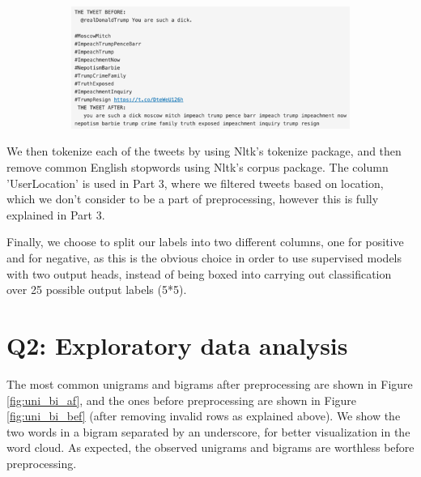 \begin{figure}
    \centering
    \begin{subfigure}{0.5\columnwidth}
        \includegraphics[width=1\textwidth]{images/prepr1.png}
    \end{subfigure}
    \caption{}
    \label{fig:prepr}
\end{figure}


We then tokenize each of the tweets by using Nltk's tokenize package, and then remove common English stopwords using Nltk's corpus package.
The column 'UserLocation' is used in Part 3, where we filtered tweets based on location, which we don't consider to be a part of preprocessing, however this is fully explained in Part 3. 

Finally, we choose to split our labels into two different columns, one for positive and for negative, as this is the obvious choice in order to use supervised models with two output heads, instead of being boxed into carrying out classification over 25 possible output labels (5*5).


\section*{Q2: Exploratory data analysis}
The most common unigrams and bigrams after preprocessing are shown in Figure \ref{fig:uni_bi_af}, and the ones before preprocessing are shown in Figure \ref{fig:uni_bi_bef} (after removing invalid rows as explained above). We show the two words in a bigram separated by an underscore, for better visualization in the word cloud. As expected, the observed unigrams and bigrams are worthless before preprocessing.

